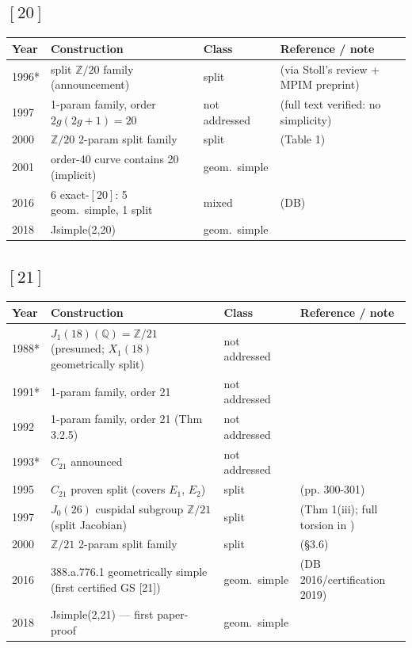 \documentclass[10pt]{amsart}
\begin{document}
\subsection*{$[20]$}
\begin{longtable}{p{0.9cm} p{7.6cm} p{2.3cm} p{4.2cm}}
\hline Year & Construction & Class & Reference / note \\ \hline
1996* & split $\mathbb{Z}/20$ family (announcement) & split & \cite{HLP1996} (via Stoll's review + MPIM preprint)\\
1997 & 1-param family, order $2g(2g{+}1) = 20$ & not addressed & \cite{Leprevost1997} (full text verified: no simplicity)\\
2000 & $\mathbb{Z}/20$ 2-param split family & split & \cite{HLP2000} (Table 1)\\
2001 & order-40 curve contains 20 (implicit) & geom.\ simple & \cite{Elkies2002}\\
2016 & 6 exact-$[20]$: 5 geom.\ simple, 1 split & mixed & \cite{BSSVY} (DB)\\
2018 & Jsimple(2,20) & geom.\ simple & \cite{Nicholls2018}\\
\hline\end{longtable}
\subsection*{$[21]$}
\begin{longtable}{p{0.9cm} p{7.6cm} p{2.3cm} p{4.2cm}}
\hline Year & Construction & Class & Reference / note \\ \hline
1988* & $J_1(18)(\mathbb{Q}) = \mathbb{Z}/21$ (presumed; $X_1(18)$ geometrically split) & not addressed & \cite{KenkuMomose1988}\\
1991* & 1-param family, order 21 & not addressed & \cite{Leprevost1991b}\\
1992 & 1-param family, order 21 (Thm 3.2.5) & not addressed & \cite{Leprevost1992}\\
1993* & $C_{21}$ announced & not addressed & \cite{Leprevost1993}\\
1995 & $C_{21}$ proven split (covers $E_1$, $E_2$) & split & \cite{Leprevost1995} (pp. 300-301)\\
1997 & $J_0(26)$ cuspidal subgroup $\mathbb{Z}/21$ (split Jacobian) & split & \cite{ChuaLing1997} (Thm 1(iii); full torsion in \cite{BruinNajman2015})\\
2000 & $\mathbb{Z}/21$ 2-param split family & split & \cite{HLP2000} (\S3.6)\\
2016 & 388.a.776.1 geometrically simple (first certified GS [21]) & geom.\ simple & \cite{BSSVY} (DB 2016/certification 2019)\\
2018 & Jsimple(2,21) — first paper-proof & geom.\ simple & \cite{Nicholls2018}\\
\hline\end{longtable}
\end{document}
